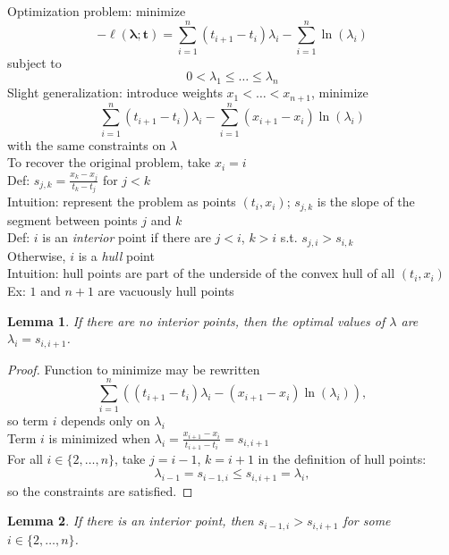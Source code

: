 \documentclass{article}
\newtheorem{lemma}{Lemma}
\begin{document}
Optimization problem: minimize
\[
-\ell(\mathbf{\lambda}; \mathbf{t}) = \sum_{i=1}^n (t_{i+1}-t_i)\lambda_i-\sum_{i=1}^n \ln(\lambda_i)
\]
subject to
\[
0 < \lambda_1 \leq \ldots \leq \lambda_n
\]
Slight generalization: introduce weights $x_1 < \ldots < x_{n+1}$,
minimize
\[
\sum_{i=1}^n (t_{i+1}-t_i)\lambda_i-\sum_{i=1}^n (x_{i+1}-x_i)\ln(\lambda_i)
\]
with the same constraints on $\lambda$ \\
To recover the original problem, take $x_i = i$ \\
Def: $s_{j,k} = \frac{x_k-x_j}{t_k-t_j}$ for $j < k$ \\
Intuition: represent the problem as points $(t_i, x_i)$; $s_{j,k}$ is the slope of the segment between points $j$ and $k$ \\
Def: $i$ is an \textit{interior} point
if there are $j < i$, $k > i$ s.t.
$s_{j,i} > s_{i,k}$ \\
Otherwise, $i$ is a \textit{hull} point \\
Intuition: hull points are part of the underside of the convex hull of all $(t_i, x_i)$ \\
Ex: $1$ and $n+1$ are vacuously hull points
\begin{lemma}
  If there are no interior points,
  then the optimal values of $\lambda$ are $\lambda_i = s_{i,i+1}$.
\end{lemma}
\begin{proof}
  Function to minimize may be rewritten
  \[
  \sum_{i=1}^n\left((t_{i+1}-t_i)\lambda_i-(x_{i+1}-x_i)\ln(\lambda_i)\right),
  \]
  so term $i$ depends only on $\lambda_i$ \\
  Term $i$ is minimized when $\lambda_i = \frac{x_{i+1}-x_i}{t_{i+1}-t_i} = s_{i,i+1}$ \\
  For all $i \in \{2, \ldots, n\}$,
  take $j = i-1$, $k = i+1$
  in the definition of hull points:
  \[
  \lambda_{i-1} = s_{i-1,i} \leq s_{i,i+1} = \lambda_i,
  \]
  so the constraints are satisfied.
\end{proof}
\begin{lemma}
  If there is an interior point,
  then $s_{i-1,i} > s_{i,i+1}$ for some $i \in \{2, \ldots, n\}$.
\end{lemma}
\end{document}
